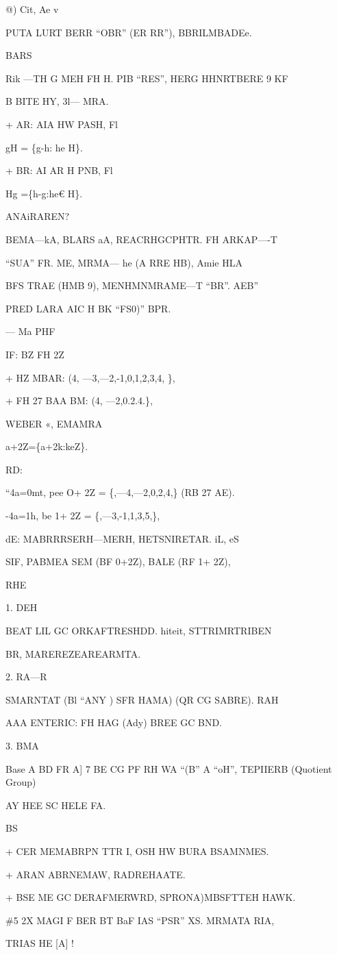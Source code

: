 \begin{definition}[陪集的定义]

@) Cit, Ae v

PUTA LURT BERR “OBR” (ER RR”), BBRILMBADEe.

BARS

Rik —TH G MEH FH H. PIB “RES”, HERG HHNRTBERE 9 KF

B BITE HY, 3l— MRA.

+ AR: AIA HW PASH, Fl

gH = \{g-h: he H\}.

+ BR: AI AR H PNB, Fl

Hg =\{h-g:he€ H\}.

ANAiRAREN?

BEMA—kA, BLARS aA, REACRHGCPHTR. FH ARKAP—-T

“SUA” FR. ME, MRMA— he (A RRE HB), Amie HLA

BFS TRAE (HMB 9), MENHMNMRAME—T “BR”. AEB”

PRED LARA AIC H BK “FS0)” BPR.

— Ma PHF

IF: BZ FH 2Z

+ HZ MBAR: (4, —3,—2,-1,0,1,2,3,4, \},

+ FH 27 BAA BM: (4, —2,0.2.4.\},

WEBER «, EMAMRA

a+2Z=\{a+2k:keZ\}.

RD:

“4a=0mt, pee O+ 2Z = \{,—4,—2,0,2,4,\} (RB 27 AE).

-4a=1h, be 1+ 2Z = \{,—3,-1,1,3,5,\},

dE: MABRRRSERH—MERH, HETSNIRETAR. iL, eS

SIF, PABMEA SEM (BF 0+2Z), BALE (RF 1+ 2Z),

RHE

1. DEH

BEAT LIL GC ORKAFTRESHDD. hiteit, STTRIMRTRIBEN

BR, MAREREZEAREARMTA.

2. RA—R

SMARNTAT (Bl “ANY ) SFR HAMA) (QR CG SABRE). RAH

AAA ENTERIC: FH HAG (Ady) BREE GC BND.

3. BMA

Base A BD FR A] 7 BE CG PF RH WA “(B” A “oH”, TEPIIERB (Quotient Group)

AY HEE SC HELE FA.

BS

+ CER MEMABRPN TTR I, OSH HW BURA BSAMNMES.

+ ARAN ABRNEMAW, RADREHAATE.

+ BSE ME GC DERAFMERWRD, SPRONA)MBSFTTEH HAWK.

\#5 2X MAGI F BER BT BaF IAS “PSR” XS. MRMATA RIA,

TRIAS HE [A] !

\end{definition}

